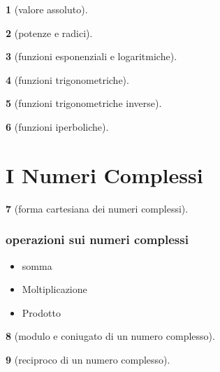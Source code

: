 \documentclass{article}
\theoremstyle{mystyle}
\newtheorem*{mydefinition}{}
\begin{document}
\begin{mydefinition}[valore assoluto]
    
\end{mydefinition}

\begin{mydefinition}[potenze e radici]
    
\end{mydefinition}

\begin{mydefinition}[funzioni esponenziali e logaritmiche]
    
\end{mydefinition}

\begin{mydefinition}[funzioni trigonometriche]
    
\end{mydefinition}

\begin{mydefinition}[funzioni trigonometriche inverse]
    
\end{mydefinition}

\begin{mydefinition}[funzioni iperboliche]
    
\end{mydefinition}

\section{I Numeri Complessi}
\begin{mydefinition}[forma cartesiana dei numeri complessi]
    
\end{mydefinition}
\subsubsection{operazioni sui numeri complessi}
\begin{itemize}
    \item somma
    \item Moltiplicazione
    \item Prodotto
\end{itemize}

\begin{mydefinition}[modulo e coniugato di un numero complesso]
    
\end{mydefinition}

\begin{mydefinition}[reciproco di un numero complesso]
    
\end{mydefinition}
\end{document}
